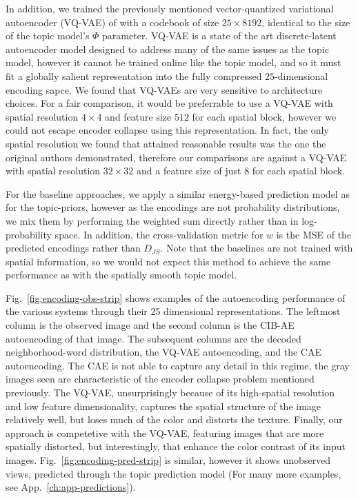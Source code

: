 In addition, we trained the previously mentioned vector-quantized variational autoencoder (VQ-VAE) of \citep{vqvae2017} with a codebook of size $25 \times 8192$, identical to the size of the topic model's $\Phi$ parameter.  VQ-VAE is a state of the art discrete-latent autoencoder model designed to address many of the same issues as the topic model, however it cannot be trained online like the topic model, and so it must fit a globally salient representation into the fully compressed $25$-dimensional encoding sapce. We found that VQ-VAEs are very sensitive to architecture choices. For a fair comparison, it would be preferrable to use a VQ-VAE with spatial resolution $4 \times 4$ and feature size $512$ for each spatial block, however we could not escape encoder collapse using this representation. In fact, the only spatial resolution we found that attained reasonable results was the one the original authors demonstrated, therefore our comparisons are against a VQ-VAE with spatial resolution $32 \times 32$ and a feature size of just $8$ for each spatial block.

For the baseline approaches, we apply a similar energy-based prediction model as for the topic-priors, however as the encodings are not probability distributions, we mix them by performing the weighted sum directly rather than in log-probability space. In addition, the cross-validation metric for $w$ is the MSE of the predicted encodings rather than $D_{JS}$. Note that the baselines are not trained with spatial information, so we would not expect this method to achieve the same performance as with the spatially smooth topic model.

Fig.~\ref{fig:encoding-obs-strip} shows examples of the autoencoding performance of the various systems through their 25 dimensional representations. The leftmost column is the observed image and the second column is the CIB-AE autoencoding of that image. The subsequent columns are the decoded neighborhood-word distribution, the VQ-VAE autoencoding, and the CAE autoencoding. The CAE is not able to capture any detail in this regime, the gray images seen are characteristic of the encoder collapse problem mentioned previously. The VQ-VAE, unsurprisingly because of its high-spatial resolution and low feature dimensionality, captures the spatial structure of the image relatively well, but loses much of the color and distorts the texture. Finally, our approach is competetive with the VQ-VAE, featuring images that are more spatially distorted, but interestingly, that enhance the color contrast of its input images. Fig.~\ref{fig:encoding-pred-strip} is similar, however it shows unobserved views, predicted through the topic prediction model (For many more examples, see App.~\ref{ch:app-predictions}).


